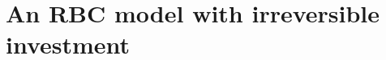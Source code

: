 \documentclass[12pt]{article}
\begin{document}
\small\normalsize%
\doublespace

\clearpage
\section*{An RBC model with irreversible investment}

\end{document}
